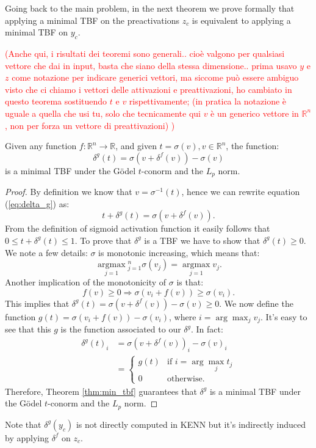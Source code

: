 \textcolor{unipd}{Going back to the main problem, in the next theorem we prove formally that applying a minimal TBF on the preactivations $z_c$ is equivalent to applying a minimal TBF on $y_c$.}

\textcolor{red}{(Anche qui, i risultati dei teoremi sono generali.. cioè valgono per qualsiasi vettore che dai in input, basta che siano della stessa dimensione.. prima usavo $y$ e $z$ come notazione per indicare generici vettori, ma siccome può essere ambiguo visto che ci chiamo i vettori delle attivazioni e preattivazioni, ho cambiato in questo teorema sostituendo $t$ e $v$ rispettivamente; (in pratica la notazione è uguale a quella che usi tu, solo che tecnicamente qui $v$ è un generico vettore in $\mathbb{R}^n$, non per forza un vettore di preattivazioni) )}

\begin{theorem}
	Given any function $f:\mathbb{R}^n\rightarrow\mathbb{R}$, and given $t = \sigma(v), v\in 
	\mathbb{R}^n$, the function:
	\begin{equation}
	\delta^g(t) = \sigma(v+\delta^f(v))-\sigma(v)
	\label{eq:delta_g}
	\end{equation}
	is a minimal TBF under the Gödel $t$-conorm and the $L_p$ norm.
\end{theorem}
\begin{proof}
	By definition we know that $v = \sigma^{-1} (t)$, hence we can rewrite equation (\ref{eq:delta_g}) as:
	$$ t + \delta^g(t) = \sigma(v + \delta^f(v)).$$
	From the definition of sigmoid activation function it easily follows that $0 \leq t + \delta^g(t) \leq 1$. To prove that $\delta^g$ is a TBF we have to show that $\delta^g(t) \geq 0$.
	We note a few details: $\sigma$ is monotonic increasing, which means that:
	$$
	\underset{j=1}{\operatorname{argmax}}{ }_{j=1}^{n} \sigma\left(v_{j}\right)=\underset{j=1}{\operatorname{argmax}} v_{j}.
	$$
	Another implication of the monotonicity of $\sigma$ is that:
	$$
	f(v) \geq 0 \Rightarrow \sigma\left(v_{i}+f(v)\right) \geq \sigma\left(v_{i}\right).
	$$
	This implies that $\delta^g(t)=\sigma(v+\delta^f(v)) - \sigma(v) \geq 0$.
	We now define the function $g(t) = \sigma(v_i + f(v)) - \sigma(v_i)$, where $i = \arg\max_j v_j$. It's easy to see that this $g$ is the function associated to our $\delta^g$. In fact:
	\begin{align*}
	\delta^g(t)_i &= \sigma(v + \delta^f(v))_i - \sigma(v)_i \\
	&=\begin{cases}
	g(t) &\text{if } i=\arg\max_j t_j\\
	0 &\text{otherwise.}
	\end{cases}
	\end{align*}
	Therefore, Theorem \ref{thm:min_tbf} guarantees that $\delta^g$ is a minimal TBF under the Gödel $t$-conorm and the $L_p$ norm.
\end{proof}
\textcolor{unipd}{Note that $\delta^g(y_c)$ is not directly computed in KENN but it's indirectly induced by applying $\delta^f$ on $z_c$.} 


